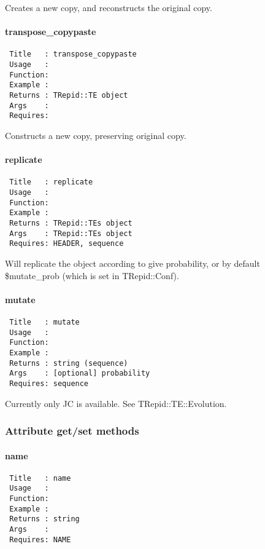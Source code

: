 Creates a new copy, and reconstructs the original copy.

\paragraph*{transpose\_copypaste\label{transpose_copypaste}}
\begin{verbatim}
 Title   : transpose_copypaste
 Usage   :
 Function: 
 Example :
 Returns : TRepid::TE object
 Args    :
 Requires:
\end{verbatim}


Constructs a new copy, preserving original copy.

\paragraph*{replicate\label{replicate}}
\begin{verbatim}
 Title   : replicate
 Usage   : 
 Function: 
 Example : 
 Returns : TRepid::TEs object
 Args    : TRepid::TEs object
 Requires: HEADER, sequence
\end{verbatim}


Will replicate the object according to give probability, or by
default \$mutate\_prob (which is set in TRepid::Conf).

\paragraph*{mutate\label{mutate}}
\begin{verbatim}
 Title   : mutate
 Usage   : 
 Function: 
 Example : 
 Returns : string (sequence)
 Args    : [optional] probability
 Requires: sequence
\end{verbatim}


Currently only JC is available. See TRepid::TE::Evolution.

\subsubsection*{Attribute get/set methods\label{Attribute_get_set_methods}}
\paragraph*{name\label{name}}
\begin{verbatim}
 Title   : name
 Usage   :
 Function: 
 Example :
 Returns : string
 Args    :
 Requires: NAME
\end{verbatim}

